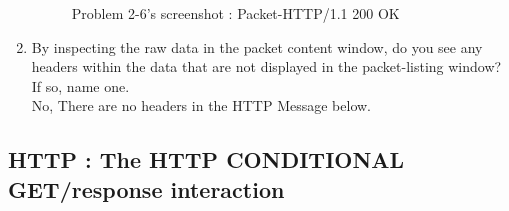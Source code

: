 \begin{enumerate}[label=\bfseries Problem \arabic*:,leftmargin=*,labelindent=1em]
\begin{figure}[!h]
        		\caption{\footnotesize Problem 2-6's screenshot : Packet-HTTP/1.1 200 OK}
        		\vspace{-10pt}
            \end{figure}            
        \item By inspecting the raw data in the packet content window, 
        do you see any headers within the data that are not displayed in the packet-listing window?
        If so, name one.\\[0.2mm]
            \soln No, There are no headers in the HTTP Message below.
            
\newpage
    \end{enumerate}
\subsection{HTTP : The HTTP CONDITIONAL GET/response interaction}

